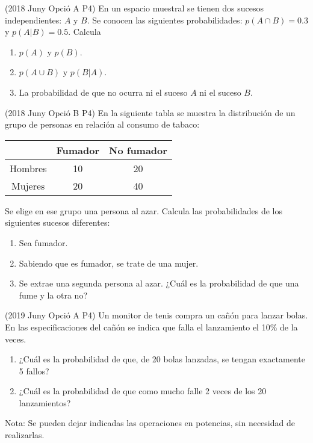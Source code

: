 \item (2018 Juny Opció A P4) En un espacio muestral se tienen dos sucesos independientes: $A$ y $B$. Se conocen las siguientes probabilidades: $p(A \cap B) = 0.3$ y $p(A|B) = 0.5$. Calcula
\begin{enumerate}
 \item $p(A)$ y $p(B)$.
 \item $p(A \cup B)$ y $p(B|A)$.
 \item La probabilidad de que no ocurra ni el suceso $A$ ni el suceso $B$.
\end{enumerate}

\item (2018 Juny Opció B P4) En la siguiente tabla se muestra la distribución de un grupo de personas en relación al consumo de tabaco:
\begin{center}
    \begin{tabular}{|c|c|c|}
            \hline
            & Fumador & No fumador \\ \hline
            Hombres & 10 & 20  \\ \hline
            Mujeres & 20 & 40  \\ \hline
    \end{tabular}
\end{center}
Se elige en ese grupo una persona al azar. Calcula las probabilidades de los siguientes sucesos diferentes:
\begin{enumerate}
 \item Sea fumador.
 \item Sabiendo que es fumador, se trate de una mujer.
 \item Se extrae una segunda persona al azar. ¿Cuál es la probabilidad de que una fume y la otra no?
\end{enumerate}



\item (2019 Juny Opció A P4) Un monitor de tenis compra un cañón para lanzar bolas. En las especificaciones del cañón se indica que falla el lanzamiento el 10\% de la veces.
\begin{enumerate}
 \item ¿Cuál es la probabilidad de que, de 20 bolas lanzadas, se tengan exactamente 5 fallos?
 \item ¿Cuál es la probabilidad de que como mucho falle 2 veces de los 20 lanzamientos?
\end{enumerate}
Nota: Se pueden dejar indicadas las operaciones en potencias, sin necesidad de realizarlas.

